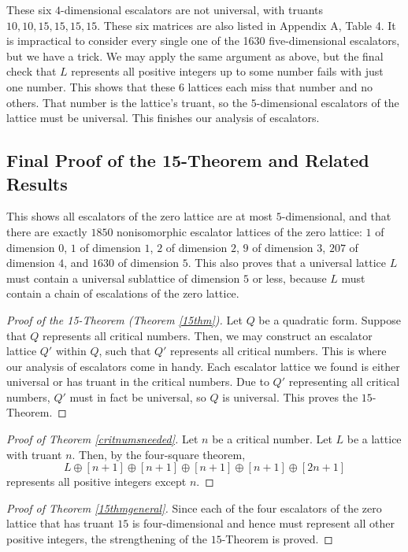 \documentclass[letterpaper, 12pt]{article}
\begin{document}
These six $4$-dimensional escalators are not universal, with truants $10,10,15,15,15,15$. These six matrices are also listed in Appendix A, Table 4. It is impractical to consider every single one of the 1630 five-dimensional escalators, but we have a trick. We may apply the same argument as above, but the final check that $L$ represents all positive integers up to some number fails with just one number. This shows that these $6$ lattices each miss that number and no others. That number is the lattice's truant, so the $5$-dimensional escalators of the lattice must be universal. This finishes our analysis of escalators.

\subsection{Final Proof of the 15-Theorem and Related Results}
This shows all escalators of the zero lattice are at most $5$-dimensional, and that there are exactly $1850$ nonisomorphic escalator lattices of the zero lattice: $1$ of dimension $0$, $1$ of dimension $1$, $2$ of dimension $2$, $9$ of dimension $3$, $207$ of dimension $4$, and $1630$ of dimension $5$. This also proves that a universal lattice $L$ must contain a universal sublattice of dimension $5$ or less, because $L$ must contain a chain of escalations of the zero lattice.

\begin{proof}[Proof of the 15-Theorem (Theorem \ref{15thm})]
    Let $Q$ be a quadratic form. Suppose that $Q$ represents all critical numbers. Then, we may construct an escalator lattice $Q'$ within $Q$, such that $Q'$ represents all critical numbers. This is where our analysis of escalators come in handy.
    Each escalator lattice we found is either universal or has truant in the critical numbers. Due to $Q'$ representing all critical numbers, $Q'$ must in fact be universal, so $Q$ is universal. This proves the $15$-Theorem.
\end{proof}
\begin{proof}[Proof of Theorem \ref{critnumsneeded}]
    Let $n$ be a critical number. Let $L$ be a lattice with truant $n$. Then, by the four-square theorem,
    \[L \oplus [n + 1] \oplus [n + 1] \oplus [n + 1] \oplus [n + 1] \oplus [2n + 1]\]
    represents all positive integers except $n$.
\end{proof}
\begin{proof}[Proof of Theorem \ref{15thmgeneral}]
    Since each of the four escalators of the zero lattice that has truant $15$ is four-dimensional and hence must represent all other positive integers, the strengthening of the $15$-Theorem is proved.
\end{proof}
\end{document}
